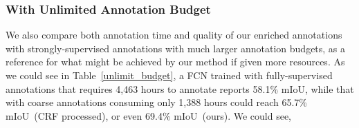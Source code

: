 \documentclass[sigconf]{acmart}
\begin{document}
\subsubsection{With Unlimited Annotation Budget }
We also compare both annotation time and quality of our enriched annotations with strongly-supervised annotations with much larger annotation budgets, as a reference for what might be achieved by our method if given more resources. As we could see in Table~\ref{unlimit_budget}, a FCN trained with fully-supervised annotations that requires 4,463 hours to annotate reports 58.1\% mIoU, while that with coarse annotations consuming only 1,388 hours could reach 65.7\% mIoU~(CRF processed), or even 69.4\% mIoU~(ours). We could see,
\begin{figure*}[!htb]
	\centering
\end{figure*}
\end{document}
